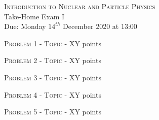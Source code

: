 \documentclass[a4paper,11pt]{report}
\begin{document}
\begin{center}
{\large \textsc{Introduction to Nuclear and Particle Physics}} \\[0.5cm]
\Large{Take-Home Exam I\\
Due: Monday $14^{th}$ December 2020 at 13:00}
\end{center}

{\large \textsc{Problem 1 - Topic} - XY points}

{\large \textsc{Problem 2 - Topic} - XY points}

{\large \textsc{Problem 3 - Topic} - XY points}

{\large \textsc{Problem 4 - Topic} - XY points}

{\large \textsc{Problem 5 - Topic} - XY points}
\end{document}
